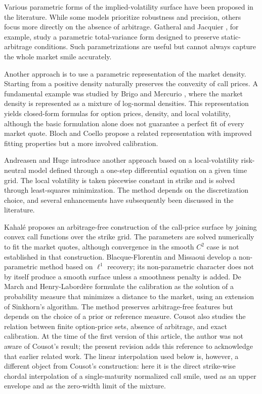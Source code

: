 \documentclass[11pt]{article}
\begin{document}
Various parametric forms of the implied-volatility surface have been proposed in the literature. While some models prioritize robustness and precision, others focus more directly on the absence of arbitrage. Gatheral and Jacquier \cite{gatheraljacquier}, for example, study a parametric total-variance form designed to preserve static-arbitrage conditions. Such parametrizations are useful but cannot always capture the whole market smile accurately.

Another approach is to use a parametric representation of the market density. Starting from a positive density naturally preserves the convexity of call prices. A fundamental example was studied by Brigo and Mercurio \cite{brigo2000,brigo2002,mixedup}, where the market density is represented as a mixture of log-normal densities. This representation yields closed-form formulas for option prices, density, and local volatility, although the basic formulation alone does not guarantee a perfect fit of every market quote. Bloch and Coello \cite{blochcoello} propose a related representation with improved fitting properties but a more involved calibration.

Andreasen and Huge \cite{andreasenhuge} introduce another approach based on a local-volatility risk-neutral model defined through a one-step differential equation on a given time grid. The local volatility is taken piecewise constant in strike and is solved through least-squares minimization. The method depends on the discretization choice, and several enhancements have subsequently been discussed in the literature.

Kahal\'e \cite{kahale} proposes an arbitrage-free construction of the call-price surface by joining convex call functions over the strike grid. The parameters are solved numerically to fit the market quotes, although convergence in the smooth $C^2$ case is not established in that construction. Blacque-Florentin and Missaoui \cite{blacqueflorentin} develop a non-parametric method based on $\ell^1$ recovery; its non-parametric character does not by itself produce a smooth surface unless a smoothness penalty is added. De March and Henry-Labord\`ere \cite{demarch} formulate the calibration as the solution of a probability measure that minimizes a distance to the market, using an extension of Sinkhorn's algorithm. The method preserves arbitrage-free features but depends on the choice of a prior or reference measure. Cousot \cite{cousot2007} also studies the relation between finite option-price sets, absence of arbitrage, and exact calibration. At the time of the first version of this article, the author was not aware of Cousot's result; the present revision adds this reference to acknowledge that earlier related work. The linear interpolation used below is, however, a different object from Cousot's construction: here it is the direct strike-wise chordal interpolation of a single-maturity normalized call smile, used as an upper envelope and as the zero-width limit of the mixture.
\end{document}

